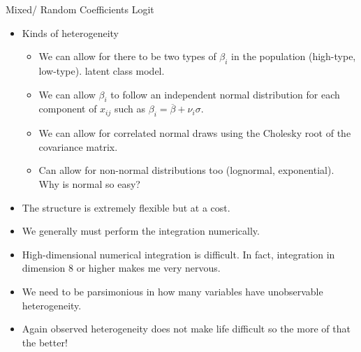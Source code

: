 \documentclass[xcolor=pdftex,dvipsnames,table,mathserif]{beamer}
\begin{document}
%

\begin{frame}{Mixed/ Random Coefficients Logit}
\begin{itemize}
\item Kinds of heterogeneity
\begin{itemize}
\item We can allow for there to be two types of $\beta_i$ in the population (high-type, low-type). \alert{latent class model}.
\item We can allow $\beta_i$ to follow an independent normal distribution for each component of $x_{ij}$ such as $\beta_i = \overline{\beta} + \nu_i \sigma$.
\item We can allow for correlated normal draws using the Cholesky root of the covariance matrix.
\item Can allow for non-normal distributions too (lognormal, exponential). Why is normal so easy?
\end{itemize}
\item The structure is extremely flexible but at a cost.
\item We generally must perform the integration numerically.
\item High-dimensional numerical integration is difficult. In fact, integration in dimension 8 or higher makes me very nervous.
\item We need to be parsimonious in how many variables have unobservable heterogeneity.
\item Again observed heterogeneity does not make life difficult so the more of that the better!
\end{itemize}
\end{frame}
\end{document}
